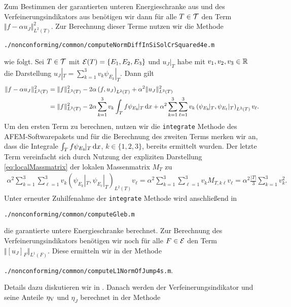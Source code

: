 Zum Bestimmen der garantierten unteren Energieschranke aus  und
des Verfeinerungsindikators aus  benötigen wir
dann für alle $T\in\mathcal{T}$ den Term $\Vert f-\alpha u_J\Vert_{L^2(T)}^2$.
Zur Berechnung dieser Terme nutzen wir die Methode
\begin{center}
  \texttt{./nonconforming/common/computeNormDiffInSiSolCrSquared4e.m}
\end{center}
wie folgt. 
Sei $T\in\mathcal{T}$ mit $\mathcal{E}(T)=\{E_1,E_2,E_3\}$ und $u_J|_T$ habe mit
$v_1,v_2,v_3\in\mathbb{R}$ die Darstellung $u_J|_T=\sum_{k=1}^3 v_k\psi_{E_k}\!|_T$.
Dann gilt
\begin{align*}
  \Vert f-\alpha u_J\Vert_{L^2(T)}^2 
  &=
  \Vert f\Vert_{L^2(T)}^2 - 2\alpha\left(f,u_J\right)_{L^2(T)} + \alpha^2 \Vert
  u_J\Vert_{L^2(T)}^2\\
  &=
  \Vert f\Vert_{L^2(T)}^2 
  - 2\alpha\sum_{k=1}^3 v_k\int_T f\psi_{E_k}\!|_T\,\mathrm{d}x
  + \alpha^2 \sum_{k=1}^3 \sum_{\ell=1}^3 
  v_k \left(\psi_{E_k}\!|_T,\psi_{E_\ell}|_T\right)_{L^2(T)}v_\ell.
\end{align*} 
Um den ersten Term zu berechnen, nutzen wir die \texttt{integrate} Methode des
AFEM-Soft\-ware\-pakets und für die Berechnung des zweiten Terms merken wir an,
dass die Integrale $\int_T f\psi_{E_k}\!|_T\,\mathrm{d}x$, $k\in\{1,2,3\}$, bereits
ermittelt wurden.
Der letzte Term vereinfacht sich durch Nutzung der expliziten Darstellung
\eqref{eq:localMassmatrix} der lokalen Massenmatrix $M_T$ zu
\begin{align*}
  \alpha^2 \sum_{k=1}^3 \sum_{\ell=1}^3 
    v_k \left(\psi_{E_k}\!|_T,\psi_{E_\ell}|_T\right)_{L^2(T)}v_\ell
  =
  \alpha^2 \sum_{k=1}^3 \sum_{\ell=1}^3 
  v_k M_{T,k\ell} v_\ell
  =
  \alpha^2\frac{|T|}{3}\sum_{k=1}^3 v_k^2.
\end{align*}
Unter erneuter Zuhilfenahme der \texttt{integrate} Methode wird anschließend
in
\begin{center}
  \texttt{./nonconforming/common/computeGleb.m}
\end{center}
die garantierte untere Energieschranke berechnet. 
Zur Berechnung des Verfeinerungsindikators benötigen wir noch
für alle $F\in\mathcal{E}$ den Term $\Vert[u_J]_F\Vert_{L^1(F)}$. Diese ermitteln wir
in der Methode 
\begin{center}
  \texttt{./nonconforming/common/computeL1NormOfJump4s.m}.
\end{center} 
Details dazu diskutieren wir in .
Danach werden der Verfeinerungsindikator
und seine Anteile $\eta_\textup{V}$ und $\eta_J$ berechnet in der Methode
